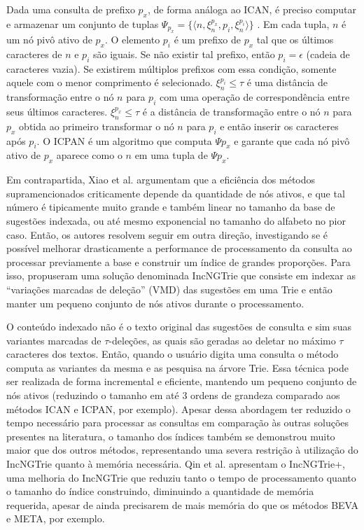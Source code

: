 Dada uma consulta de prefixo $p_{x}$, de forma análoga ao ICAN, é preciso computar e armazenar um conjunto de tuplas $\Psi_{p_{x}} = \{ \langle n, \xi_{n}^{p_{x}}, p_{i}, \xi_{n}^{p_{i}} \rangle \}$ \citep{li2011efficient}. Em cada tupla, $n$ é um nó pivô ativo de $p_{x}$. O elemento $p_{i}$ é um prefixo de $p_{x}$ tal que os últimos caracteres de $n$ e $p_{i}$ são iguais. Se não existir tal prefixo, então $p_{i} = \epsilon$ (cadeia de caracteres vazia). Se existirem múltiplos prefixos com essa condição, somente aquele com o menor comprimento é selecionado. $\xi_{n}^{p_{i}} \leq \tau$ é uma distância de transformação entre o nó $n$ para $p_{i}$ com uma operação de correspondência entre seus últimos caracteres. $\xi_{n}^{p_{x}} \leq \tau$ é a distância de transformação entre o nó $n$ para $p_{x}$ obtida ao primeiro transformar o nó $n$ para $p_{i}$ e então inserir os caracteres após $p_{i}$. O ICPAN é um algoritmo que computa $\Psi{p_{x}}$ e garante que cada nó pivô ativo de $p_{x}$ aparece como o $n$ em uma tupla de $\Psi{p_{x}}$.

Em contrapartida, Xiao et al. \citep{xiao2013efficient} argumentam que a eficiência dos métodos supramencionados criticamente depende da quantidade de nós ativos, e que tal número é tipicamente muito grande e também linear no tamanho da base de sugestões indexada, ou até mesmo exponencial no tamanho do alfabeto no pior caso. Então, os autores resolvem seguir em outra direção, investigando se é possível melhorar drasticamente a performance de processamento da consulta ao processar previamente a base e construir um índice de grandes proporções. Para isso, propuseram uma solução denominada IncNGTrie que consiste em indexar as ``variações marcadas de deleção'' (VMD) das sugestões em uma Trie e então manter um pequeno conjunto de nós ativos durante o processamento. 

O conteúdo indexado não é o texto original das sugestões de consulta e sim suas variantes marcadas de $\tau$-deleções, as quais são geradas ao deletar no máximo $\tau$ caracteres dos textos. Então, quando o usuário digita uma consulta o método computa as variantes da mesma e as pesquisa na árvore Trie. Essa técnica pode ser realizada de forma incremental e eficiente, mantendo um pequeno conjunto de nós ativos (reduzindo o tamanho em até 3 ordens de grandeza comparado aos métodos ICAN e ICPAN, por exemplo). 
Apesar dessa abordagem ter reduzido o tempo necessário para processar as consultas em comparação às outras soluções presentes na literatura, o tamanho dos índices também se demonstrou muito maior que dos outros métodos, representando uma severa restrição à utilização do IncNGTrie quanto à memória necessária. Qin et al. \citep{qin2020efficient} apresentam o IncNGTrie+, uma melhoria do IncNGTrie que reduziu tanto o tempo de processamento quanto o tamanho do índice construindo, diminuindo a quantidade de memória requerida, apesar de ainda precisarem de mais memória do que os métodos BEVA e META, por exemplo.

